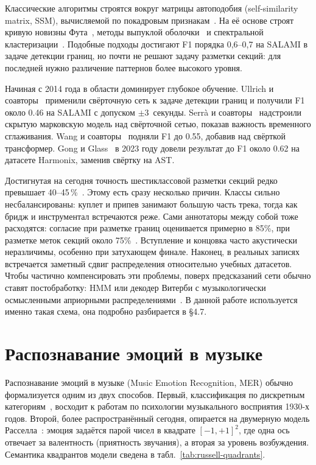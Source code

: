 Классические алгоритмы строятся вокруг матрицы автоподобия (self-similarity matrix, SSM), вычисляемой по покадровым признакам~\cite{foote2000novelty}. На её основе строят кривую новизны Фута~\cite{foote2000novelty}, методы выпуклой оболочки~\cite{serra2014unsupervised} и спектральной кластеризации~\cite{mcfee2014spectral}. Подобные подходы достигают F1 порядка 0{,}6--0{,}7 на SALAMI в задаче детекции границ, но почти не решают задачу разметки секций: для последней нужно различение паттернов более высокого уровня.

Начиная с 2014 года в области доминирует глубокое обучение. Ullrich и соавторы~\cite{ullrich2014boundary} применили свёрточную сеть к задаче детекции границ и получили F1 около 0.46 на SALAMI с допуском $\pm 3$~секунды. Serrà и соавторы~\cite{serra2018cnnhmm} надстроили скрытую марковскую модель над свёрточной сетью, показав важность временного сглаживания. Wang и соавторы~\cite{wang2022catchchorus} подняли F1 до 0.55, добавив над свёрткой трансформер. Gong и Glass~\cite{gong2023structural} в 2023 году довели результат до F1 около 0.62 на датасете Harmonix, заменив свёртку на AST.

Достигнутая на сегодня точность шестиклассовой разметки секций редко превышает 40--45\,\%~\cite{wang2022catchchorus,gong2023structural}. Этому есть сразу несколько причин. Классы сильно несбалансированы: куплет и припев занимают большую часть трека, тогда как бридж и инструментал встречаются реже. Сами аннотаторы между собой тоже расходятся: согласие при разметке границ оценивается примерно в 85\%, при разметке меток секций около 75\%~\cite{smith2011salami}. Вступление и концовка часто акустически неразличимы, особенно при затухающем финале. Наконец, в реальных записях встречается заметный сдвиг распределения относительно учебных датасетов. Чтобы частично компенсировать эти проблемы, поверх предсказаний сети обычно ставят постобработку: HMM или декодер Витерби с музыкологически осмысленными априорными распределениями~\cite{serra2018cnnhmm,gong2023structural}. В данной работе используется именно такая схема, она подробно разбирается в §4.7.

\section{Распознавание эмоций в музыке}\label{sec:1-3}

Распознавание эмоций в музыке (Music Emotion Recognition, MER) обычно формализуется одним из двух способов. Первый, классификация по дискретным категориям~\cite{hevner1936expression}, восходит к работам по психологии музыкального восприятия 1930-х годов. Второй, более распространённый сегодня, опирается на двумерную модель Расселла~\cite{russell1980circumplex}: эмоция задаётся парой чисел в квадрате $[-1, +1]^2$, где одна ось отвечает за валентность (приятность звучания), а вторая за уровень возбуждения. Семантика квадрантов модели сведена в табл.~\ref{tab:russell-quadrants}.

